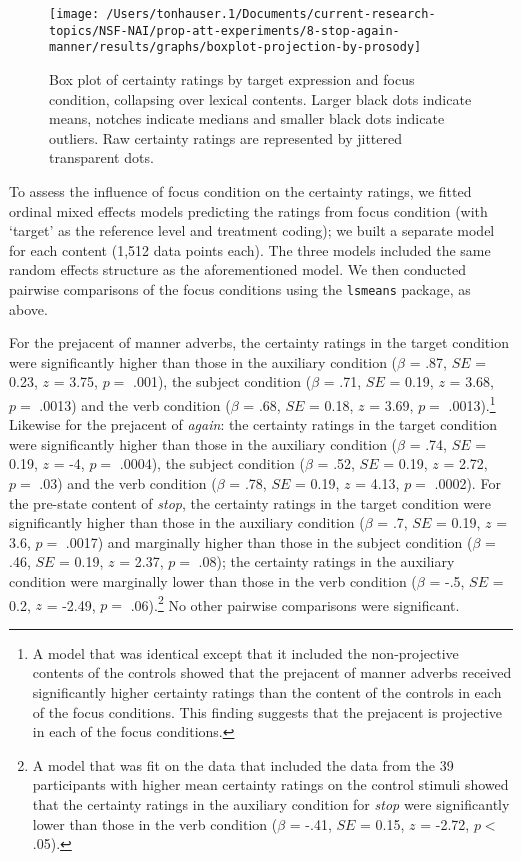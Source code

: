 \documentclass[a4paper,12pt]{article}
\newcommand{\6}{\mbox{$[\hspace*{-.6mm}[$}}
\newcommand{\9}{\mbox{$]\hspace*{-.6mm}]$}}
\begin{document}
\begin{figure}[h!]
\centering

\texttt{[image: /Users/tonhauser.1/Documents/current-research-topics/NSF-NAI/prop-att-experiments/8-stop-again-manner/results/graphs/boxplot-projection-by-prosody]}

\caption{Box plot of certainty ratings by target expression and focus condition, collapsing over lexical contents. Larger black dots indicate means, notches indicate medians and smaller black dots indicate outliers. Raw certainty ratings are represented by jittered transparent dots.}
\label{f-projectivity2}
\end{figure}


To assess the influence of focus condition on the certainty ratings, we fitted ordinal mixed effects models predicting the ratings from focus condition (with `target' as the reference level and treatment coding); we built a separate model for each content (1,512 data points each).  The three models included the same random effects structure as the aforementioned model. We then conducted pairwise comparisons of the focus conditions using the \verb|lsmeans| package, as above.

For the prejacent of manner adverbs, the certainty ratings in the target condition were significantly higher than those in the auxiliary condition ($\beta$ = .87, $SE$ = 0.23, $z$ = 3.75, $p = $ .001), the subject condition ($\beta$ = .71, $SE$ = 0.19, $z$ = 3.68, $p = $ .0013) and the verb condition ($\beta$ = .68, $SE$ = 0.18, $z$ = 3.69, $p = $ .0013).\footnote{A model that was identical except that it included the non-projective contents of the controls showed that the prejacent of manner adverbs received significantly higher certainty ratings than the content of the controls in each of the focus conditions. This finding suggests that the prejacent is projective in each of the focus conditions.} Likewise for the prejacent of {\em again}: the certainty ratings in the target condition were significantly higher than those in the auxiliary condition ($\beta$ = .74, $SE$ = 0.19, $z$ = -4, $p = $ .0004), the subject condition ($\beta$ = .52, $SE$ = 0.19, $z$ = 2.72, $p = $ .03) and the verb condition ($\beta$ = .78, $SE$ = 0.19, $z$ = 4.13, $p = $ .0002). For the pre-state content of {\em stop}, the certainty ratings in the target condition were significantly higher than those in the auxiliary condition ($\beta$ = .7, $SE$ = 0.19, $z$ = 3.6, $p = $ .0017) and marginally higher than those in the subject condition ($\beta$ = .46, $SE$ = 0.19, $z$ = 2.37, $p = $ .08); the certainty ratings in the auxiliary condition were marginally lower than those in the verb condition ($\beta$ = -.5, $SE$ = 0.2, $z$ = -2.49, $p = $ .06).\footnote{\label{fn}A model that was fit on the data that included the data from the 39 participants with higher mean certainty ratings on the control stimuli showed that the certainty ratings in the auxiliary condition for {\em stop} were significantly lower than those in the verb condition ($\beta$ = -.41, $SE$ = 0.15, $z$ = -2.72, $p < $ .05).} No other pairwise comparisons were significant. 
\end{document}
